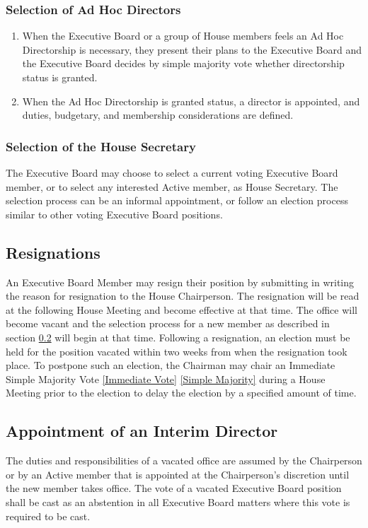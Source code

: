 \documentclass{article}
\newcommand{\asection}[1]{\subsection{#1} \label{#1}}
\newcommand{\asubsection}[1]{\subsubsection{#1} \label{#1}}
\begin{document}
\asubsection{Selection of Ad Hoc Directors}
\begin{enumerate}
	\item When the Executive Board or a group of House members feels an Ad Hoc Directorship is necessary, they present their plans to the Executive Board and the Executive Board decides by simple majority vote whether directorship status is granted.
	\item When the Ad Hoc Directorship is granted status, a director is appointed, and duties, budgetary, and membership considerations are defined.
\end{enumerate}
\asubsection{Selection of the House Secretary}
The Executive Board may choose to select a current voting Executive Board member, or to select any interested Active member, as House Secretary.
The selection process can be an informal appointment, or follow an election process similar to other voting Executive Board positions.

\asection{Resignations}
An Executive Board Member may resign their position by submitting in writing the reason for resignation to the House Chairperson.
The resignation will be read at the following House Meeting and become effective at that time.
The office will become vacant and the selection process for a new member as described in section \ref{Appointment of an Interim Director} will begin at that time.
Following a resignation, an election must be held for the position vacated within two weeks from when the resignation took place.
To postpone such an election, the Chairman may chair an Immediate Simple Majority Vote \ref{Immediate Vote} \ref{Simple Majority} during a House Meeting prior to the election to delay the election by a specified amount of time.

\asection{Appointment of an Interim Director}
The duties and responsibilities of a vacated office are assumed by the Chairperson or by an Active member that is appointed at the Chairperson's discretion until the new member takes office.
The vote of a vacated Executive Board position shall be cast as an abstention in all Executive Board matters where this vote is required to be cast.
\end{document}
